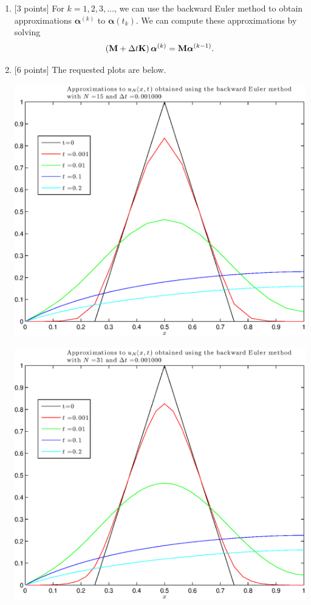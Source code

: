 \begin{solution}
\begin{enumerate}
\vspace*{1em}
\item {[3 points]} For $k=1,2,3,\ldots$, we can use the backward Euler method to obtain approximations $\boldsymbol{\alpha}^{(k)}$ to $\boldsymbol{\alpha}(t_k)$. We can compute these approximations by solving
\[
\left({\bf M}+\Delta t{\bf K}\right)\boldsymbol{\alpha}^{(k)}={\bf M}\boldsymbol{\alpha}^{(k-1)}.
\]

\vspace*{1em}
\item {[6 points]} The requested plots are below.
\begin{center}
\includegraphics[scale=0.75]{hw50f15.eps}
\end{center}
\begin{center}
\includegraphics[scale=0.75]{hw50f31.eps}
\end{center}

\end{enumerate}
\end{solution}